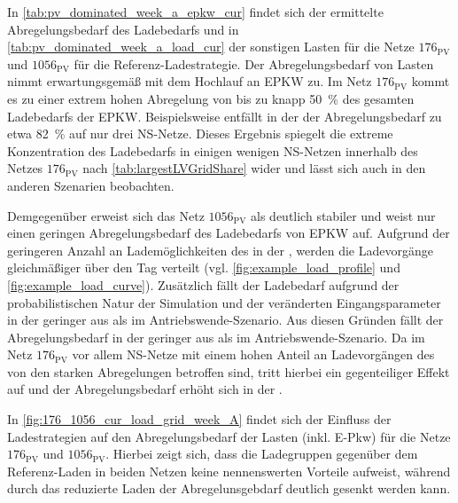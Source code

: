 



In \autoref{tab:pv_dominated_week_a_epkw_cur} findet sich der ermittelte Abregelungsbedarf des Ladebedarfs und in \autoref{tab:pv_dominated_week_a_load_cur} der sonstigen Lasten für die Netze \(176_{\text{PV}}\) und \(1056_{\text{PV}}\) für die Referenz-Ladestrategie.
Der Abregelungsbedarf von Lasten nimmt erwartungsgemäß mit dem Hochlauf an \gls{EPKW} zu.
Im Netz \(176_{\text{PV}}\) kommt es zu einer extrem hohen Abregelung von bis zu knapp \SI{50}{\percent} des gesamten Ladebedarfs der \gls{EPKW}.
Beispielsweise entfällt in der \SzeFirmenparkplatz der Abregelungsbedarf zu etwa \SI{82}{\percent} auf nur drei \gls{NS}-Netze.
Dieses Ergebnis spiegelt die extreme Konzentration des Ladebedarfs in einigen wenigen \gls{NS}-Netzen innerhalb des Netzes \(176_{\text{PV}}\) nach \autoref{tab:largestLVGridShare} wider und lässt sich auch in den anderen Szenarien beobachten.

Demgegenüber erweist sich das Netz \(1056_{\text{PV}}\) als deutlich stabiler und weist nur einen geringen Abregelungsbedarf des Ladebedarfs von \gls{EPKW} auf.
Aufgrund der geringeren Anzahl an Lademöglichkeiten des \UC \Firmeparkplatz in der \SzeFirmenparkplatzdot, werden die Ladevorgänge gleichmäßiger über den Tag verteilt (vgl. \autoref{fig:example_load_profile} und \autoref{fig:example_load_curve}).
Zusätzlich fällt der Ladebedarf aufgrund der probabilistischen Natur der Simulation und der veränderten Eingangsparameter in der \SzeFirmenparkplatz geringer aus als im Antriebswende-Szenario.
Aus diesen Gründen fällt der Abregelungsbedarf in der \SzeFirmenparkplatz geringer aus als im Antriebswende-Szenario.
Da im Netz \(176_{\text{PV}}\) vor allem \gls{NS}-Netze mit einem hohen Anteil an Ladevorgängen des \UC \zH von den starken Abregelungen betroffen sind, tritt hierbei ein gegenteiliger Effekt auf und der Abregelungsbedarf erhöht sich in der \SzeFirmenparkplatzdot.





In \autoref{fig:176_1056_cur_load_grid_week_A} findet sich der Einfluss der Ladestrategien auf den Abregelungsbedarf der Lasten (inkl. E-Pkw) für die Netze \(176_{\text{PV}}\) und \(1056_{\text{PV}}\).
Hierbei zeigt sich, dass die Ladegruppen gegenüber dem Referenz-Laden in beiden Netzen keine nennenswerten Vorteile aufweist, während durch das reduzierte Laden der Abregelunsgebdarf deutlich gesenkt werden kann.

